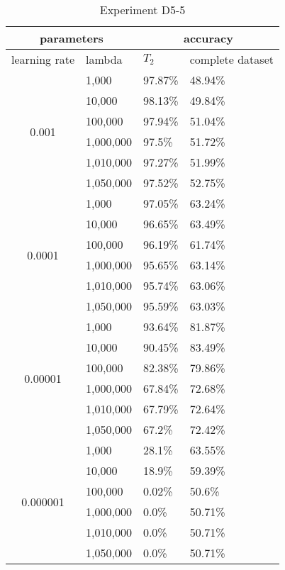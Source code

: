 \begin{table}[H]
    \centering
    \begin{tabular}{ |c|l|l|l| }
        \hline
        \multicolumn{2}{|c|}{parameters} & \multicolumn{2}{c|}{accuracy} \\
        \hline
        learning rate & lambda & $T_2$ & complete dataset\\
        \hline
        \hline
        \multirow{6}{*}{0.001} & 1,000 & 97.87\% & 48.94\%\\
                            & 10,000 & 98.13\% & 49.84\%\\
                            & 100,000 & 97.94\% & 51.04\% \\
                            & 1,000,000 & 97.5\% & 51.72\% \\
                            & 1,010,000 & 97.27\% & 51.99\% \\
                            & 1,050,000 & 97.52\% & 52.75\% \\
        \hline
        \multirow{6}{*}{0.0001} & 1,000 & 97.05\% & 63.24\%\\
                                & 10,000 & 96.65\% & 63.49\%\\
                                & 100,000 & 96.19\% & 61.74\% \\
                                & 1,000,000 & 95.65\% & 63.14\% \\
                                & 1,010,000 & 95.74\% & 63.06\% \\
                                & 1,050,000 & 95.59\% & 63.03\% \\
        \hline
        \multirow{6}{*}{0.00001} & 1,000 & 93.64\% & 81.87\%\\
                                & 10,000 & 90.45\% & 83.49\%\\
                                & 100,000 & 82.38\% & 79.86\% \\
                                & 1,000,000 & 67.84\% & 72.68\% \\
                                & 1,010,000 & 67.79\% & 72.64\% \\
                                & 1,050,000 & 67.2\% & 72.42\% \\
        \hline
        \multirow{6}{*}{0.000001} & 1,000 & 28.1\% & 63.55\% \\
                                & 10,000 & 18.9\% & 59.39\% \\
                                & 100,000 & 0.02\% & 50.6\% \\
                                & 1,000,000 & 0.0\% & 50.71\% \\
                                & 1,010,000 & 0.0\% & 50.71\% \\
                                & 1,050,000 & 0.0\% & 50.71\% \\
        \hline
    \end{tabular}
    \caption{Experiment D5-5}
    \label{table:exp_d5-5}
\end{table}

